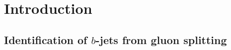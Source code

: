 
\chapter{Introduction}


\section{Identification of $b$-jets from gluon splitting}\label{sec:introduction}


